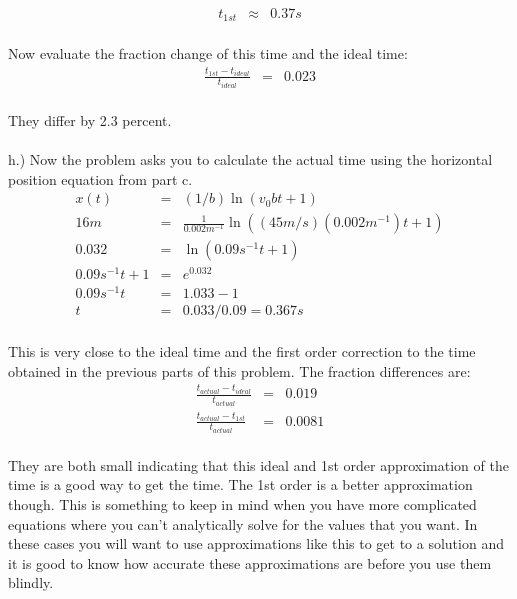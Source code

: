 \documentclass[11pt]{amsart}
\begin{document}
\begin{eqnarray*}
t_{1st} &\approx& 0.37 s 
\end{eqnarray*} \\ 
Now evaluate the fraction change of this time and the ideal time: \\ 
\begin{eqnarray*}
\frac{t_{1st}-t_{ideal}}{t_{ideal}} &=& 0.023 
\end{eqnarray*} \\
They differ by 2.3 percent. \\ \\
h.) Now the problem asks you to calculate the actual time using the horizontal position equation from part c. \\ 
\begin{eqnarray*} 
x(t) &=& (1/b) \ln(v_{0}bt+1) \\
16m &=& \frac{1}{0.002m^{-1}}\ln((45m/s)(0.002m^{-1})t+1) \\
0.032 &=& \ln(0.09s^{-1}t+1) \\
0.09s^{-1}t+1 &=& e^{0.032} \\
0.09s^{-1}t &=& 1.033 - 1 \\
t &=& 0.033/0.09 = 0.367s
\end{eqnarray*} \\
This is very close to the ideal time and the first order correction to the time obtained in the previous parts of this problem. The fraction differences are: \\ 
\begin{eqnarray*}
\frac{t_{actual}-t_{ideal}}{t_{actual}} &=& 0.019 \\
\frac{t_{actual}-t_{1st}}{t_{actual}} &=& 0.0081 
\end{eqnarray*} \\
They are both small indicating that this ideal and 1st order approximation of the time is a good way to get the time. The 1st order is a better approximation though. This is something to keep in mind when you have more complicated equations where you can't analytically solve for the values that you want. In these cases you will want to use approximations like this to get to a solution and it is good to know how accurate these approximations are before you use them blindly.
 
\end{document}
